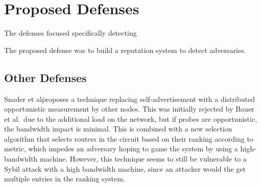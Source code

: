 \documentclass[10pt,a4paper]{article}
\begin{document}


\section{Proposed Defenses}
The defenses focused specifically detecting  


The proposed defense was to build a reputation system to detect adversaries.

\subsection{Other Defenses}

Snader et al\. proposes\cite{snader2008tune} a technique replacing self-advertisement with a distributed opportunistic measurement by other nodes.
This was initially rejected by Bauer et al.\ due to the additional load on the network, but if probes are opportunistic, the bandwidth impact is minimal.
This is combined with a new selection algorithm that selects routers in the circuit based on their ranking  according to metric, which impedes an adversary hoping to game the system by using a high-bandwidth machine.
However, this technique seems to still be vulnerable to a Sybil attack with a high bandwidth machine, since an attacker would the get multiple entries in the ranking system.






\end{document}
